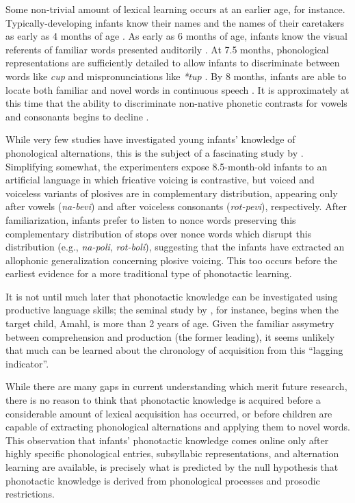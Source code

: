 Some non-trivial amount of lexical learning occurs at an earlier age, for instance.
Typically-developing infants know their names and the names of their caretakers as early as 4 months of age \citep{Bortfeld2005,Mandel1995,Tincoff1999}.
As early as 6 months of age, infants know the visual referents of familiar words presented auditorily \citep{Bergelson2012}.
At 7.5 months, phonological representations are sufficiently detailed to allow infants to discriminate between words like \emph{cup} and mispronunciations like \emph{*tup} \citep{Jusczyk1995}.
By 8 months, infants are able to locate both familiar and novel words in continuous speech \citep{Jusczyk1997,Seidl2006}.
It is approximately at this time that the ability to discriminate non-native phonetic contrasts for vowels and consonants begins to decline \citep{Best1994,Polka1994,Werker1981,Werker1984,Werker1988}.

While very few studies have investigated young infants' knowledge of phonological alternations, this is the subject of a fascinating study by \citet{White2008}.
Simplifying somewhat, the experimenters expose 8.5-month-old infants to an artificial language in which fricative voicing is contrastive, but voiced and voiceless variants of plosives are in complementary distribution, appearing only after vowels (\emph{na-bevi}) and after voiceless consonants (\emph{rot-pevi}), respectively.
After familiarization, infants prefer to listen to nonce words preserving this complementary distribution of stops over nonce words which disrupt this distribution (e.g., \emph{na-poli}, \emph{rot-boli}), suggesting that the infants have extracted an allophonic generalization concerning plosive voicing.
This too occurs before the earliest evidence for a more traditional type of phonotactic learning.

It is not until much later that phonotactic knowledge can be investigated using productive language skills; the seminal study by \citet{Smith1973}, for instance, begins when the target child, Amahl, is more than 2 years of age.
Given the familiar assymetry between comprehension and production (the former leading), it seems unlikely that much can be learned about the chronology of acquisition from this ``lagging indicator''.

While there are many gaps in current understanding which merit future research, there is no reason to think that phonotactic knowledge is acquired before a considerable amount of lexical acquisition has occurred, or before children are capable of extracting phonological alternations and applying them to novel words.
This observation that infants' phonotactic knowledge comes online only after highly specific phonological entries, subsyllabic representations, and alternation learning are available, is precisely what is predicted by the null hypothesis that phonotactic knowledge is derived from phonological processes and prosodic restrictions.

